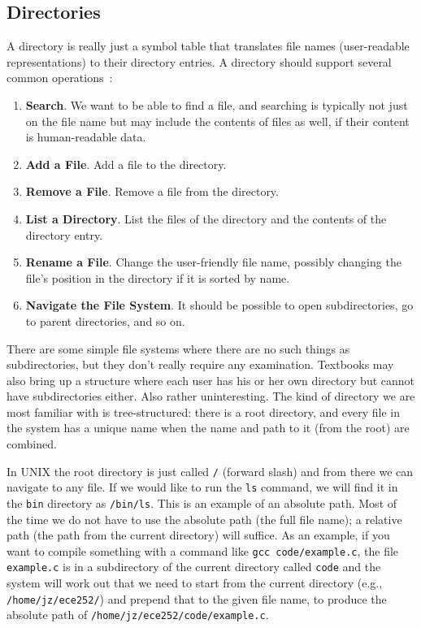 \documentclass[a4paper]{report}
\begin{document}
\subsection*{Directories}

A directory is really just a symbol table that translates file names (user-readable representations) to their directory entries. A directory should support several common operations~\cite{osc}:

\begin{enumerate}
	\item \textbf{Search}. We want to be able to find a file, and searching is typically not just on the file name but may include the contents of files as well, if their content is human-readable data.
	\item \textbf{Add a File}. Add a file to the directory.
	\item \textbf{Remove a File}. Remove a file from the directory.
	\item \textbf{List a Directory}. List the files of the directory and the contents of the directory entry.
	\item \textbf{Rename a File}. Change the user-friendly file name, possibly changing the file's position in the directory if it is sorted by name.
	\item \textbf{Navigate the File System}. It should be possible to open subdirectories, go to parent directories, and so on.
\end{enumerate}

There are some simple file systems where there are no such things as subdirectories, but they don't really require any examination. Textbooks may also bring up a structure where each user has his or her own directory but cannot have subdirectories either. Also rather uninteresting. The kind of directory we are most familiar with is tree-structured: there is a root directory, and every file in the system has a unique name when the name and path to it (from the root) are combined.

In UNIX the root directory is just called \texttt{/} (forward slash) and from there we can navigate to any file. If we would like to run the \texttt{ls} command, we will find it in the \texttt{bin} directory as \texttt{/bin/ls}. This is an example of an absolute path. Most of the time we do not have to use the absolute path (the full file name); a relative path (the path from the current directory) will suffice. As an example, if you want to compile something with a command like \texttt{gcc code/example.c}, the file \texttt{example.c} is in a subdirectory of the current directory called \texttt{code} and the system will work out that we need to start from the current directory (e.g., \texttt{/home/jz/ece252/}) and prepend that to the given file name, to produce the absolute path of \texttt{/home/jz/ece252/code/example.c}.
\end{document}
